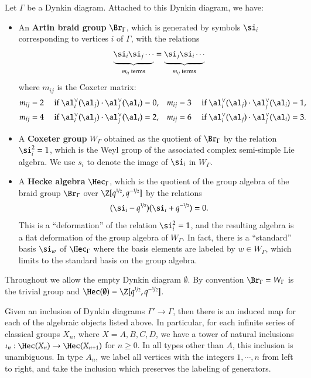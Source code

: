 \documentclass[12pt]{amsart}
\def\to{\rightarrow}
\theoremstyle{remark}
\begin{document}
Let $\Gamma$ be a Dynkin diagram.  Attached to this Dynkin diagram, we have:
\begin{itemize}
\item An {\bf Artin braid group} $\Br_{\Gamma}$, which is generated by
  symbols $\si_i$ corresponding to vertices $i$ of $\Gamma$, with the relations
  \begin{equation*}
   \underbrace{\si_i\si_j\cdots}_{m_{ij} \text{ terms}}=\underbrace{\si_j\si_i\cdots}_{m_{ij} \text{ terms}}
  \end{equation*}
  where $m_{ij}$ is the Coxeter matrix:
  \begin{align*}
    m_{ij}=2&\quad \text{ if }\al_i^\vee(\al_j)\cdot\al_j^\vee(\al_i)=0, &
    m_{ij}=3&\quad \text{ if }\al_i^\vee(\al_j)\cdot\al_j^\vee(\al_i)=1,\\
    m_{ij}=4&\quad \text{ if }\al_i^\vee(\al_j)\cdot\al_j^\vee(\al_i)=2,&
    m_{ij}=6&\quad \text{ if }\al_i^\vee(\al_j)\cdot\al_j^\vee(\al_i)=3.
  \end{align*}
\item A {\bf Coxeter group} $W_{\Gamma}$ obtained as the quotient of
  $\Br_{\Gamma}$ by the relation $\si_i^2=1$, which is the Weyl group
  of the associated complex semi-simple Lie algebra.  We use $s_i$ to
  denote the image of $\si_i$ in $W_{\Gamma}$.
\item A {\bf Hecke algebra} $\Hec_{\Gamma}$, which is the quotient of the
  group algebra of the braid group $\Br_{\Gamma}$ over
  $\Z[q^{\nicefrac{1}{2}},q^{-\nicefrac{1}{2}}]$ by the relations
\begin{equation*}
  (\si_i-q^{\nicefrac{1}{2}})(\si_i+q^{- \nicefrac{1}{2}})=0.
\end{equation*}
This is a ``deformation'' of the relation $\si_i^2=1$, and the resulting
algebra is a flat deformation of the group algebra of $W_{\Gamma}$.
In fact, there is a
``standard'' basis $\si_w$ of $\Hec_{\Gamma}$ where the basis elements
are labeled by $w\in W_{\Gamma}$, which limits to the standard basis on
the group algebra.
\end{itemize}

Throughout we allow the empty Dynkin diagram $\emptyset$. By
convention $\Br_{\Gamma} = W_{\Gamma}$ is the trivial group and 
$\Hec(\emptyset)=\Z[q^{\nicefrac{1}{2}},q^{-\nicefrac{1}{2}}]$.

Given an inclusion of Dynkin diagrams $\Gamma'\to
\Gamma$, then there is an induced map for each of the algebraic
objects listed above.  In particular, for each infinite series of
classical groups $X_n$,
where $X=A,B,C,D$, we
have a tower of natural inclusions $\iota_n:\Hec(X_n)\to
\Hec(X_{n+1})$ for $n \ge 0$.  In all types other than $A$, this inclusion is
unambiguous.  In type $A_n$, we label all vertices with the integers
$1,\cdots, n$ from left to right, and take the inclusion
which preserves the labeling of generators. %
\end{document}
